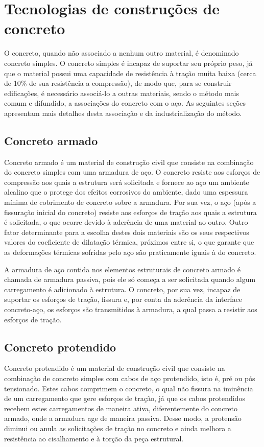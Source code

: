 \section{Tecnologias de construções de concreto}

O concreto, quando não associado a nenhum outro material, é denominado concreto simples. O concreto simples é incapaz de suportar seu próprio peso, já que o material possui uma capacidade de resistência à tração muita baixa (cerca de 10\% de sua resistência a compressão), de modo que, para se construir edificações, é necessário associá-lo a outras materiais, sendo o método mais comum e difundido, a associações do concreto com o aço. As seguintes seções apresentam mais detalhes desta associação e da industrialização do método.

\subsection{Concreto armado}

Concreto armado é um material de construção civil que consiste na combinação do concreto simples com uma armadura de aço. O concreto resiste aos esforços de compressão aos quais a estrutura será solicitada e fornece ao aço um ambiente alcalino que o protege dos efeitos corrosivos do ambiente, dado uma espessura mínima de cobrimento de concreto sobre a armadura. Por sua vez, o aço (após a fissuração inicial do concreto) resiste aos esforços de tração aos quais a estrutura é solicitada, o que ocorre devido à aderência de uma material ao outro. Outro fator determinante para a escolha destes dois materiais são os seus respectivos valores do coeficiente de dilatação térmica, próximos entre si, o que garante que as deformações térmicas sofridas pelo aço são praticamente iguais à do concreto.

A armadura de aço contida nos elementos estruturais de concreto armado é chamada de armadura passiva, pois ele só começa a ser solicitada quando algum carregamento é adicionado à estrutura. O concreto, por sua vez, incapaz de suportar os esforços de tração, fissura e, por conta da aderência da interface concreto-aço, os esforços são transmitidos à armadura, a qual passa a resistir aos esforços de tração.

\subsection{Concreto protendido}

Concreto protendido é um material de construção civil que consiste na combinação de concreto simples com cabos de aço protendido, isto é, pré ou pós tensionado. Estes cabos comprimem o concreto, o qual não fissura na iminência de um carregamento que gere esforços de tração, já que os cabos protendidos recebem estes carregamentos de maneira ativa, diferentemente do concreto armado, onde a armadura age de maneira passiva. Desse modo, a protensão diminui ou anula as solicitações de tração no concreto e ainda melhora a resistência ao cisalhamento e à torção da peça estrutural.


